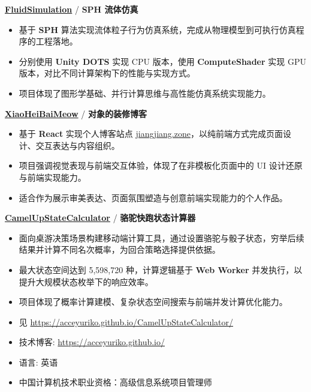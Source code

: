 \par \textbf{\href{https://github.com/Acceyuriko/FluidSimulation}{FluidSimulation}} / \textbf{SPH 流体仿真}
\begin{itemize}
  \item 基于 \textbf{SPH} 算法实现流体粒子行为仿真系统，完成从物理模型到可执行仿真程序的工程落地。
  \item 分别使用 \textbf{Unity DOTS} 实现 CPU 版本，使用 \textbf{ComputeShader} 实现 GPU 版本，对比不同计算架构下的性能与实现方式。
  \item 项目体现了图形学基础、并行计算思维与高性能仿真系统实现能力。
\end{itemize}

\par \textbf{\href{https://github.com/Acceyuriko/XiaoHeiBaiMeow}{XiaoHeiBaiMeow}} / \textbf{对象的装修博客}
\begin{itemize}
  \item 基于 \textbf{React} 实现个人博客站点 \href{https://jiangjiang.zone/}{jiangjiang.zone}，以纯前端方式完成页面设计、交互表达与内容组织。
  \item 项目强调视觉表现与前端交互体验，体现了在非模板化页面中的 UI 设计还原与前端实现能力。
  \item 适合作为展示审美表达、页面氛围塑造与创意前端实现能力的个人作品。
\end{itemize}

\par \textbf{\href{https://github.com/Acceyuriko/CamelUpStateCalculator}{CamelUpStateCalculator}} / \textbf{骆驼快跑状态计算器}
\begin{itemize}
  \item 面向桌游决策场景构建移动端计算工具，通过设置骆驼与骰子状态，穷举后续结果并计算不同名次概率，为回合策略选择提供依据。
  \item 最大状态空间达到 5,598,720 种，计算逻辑基于 \textbf{Web Worker} 并发执行，以提升大规模状态枚举下的响应效率。
  \item 项目体现了概率计算建模、复杂状态空间搜索与前端并发计算优化能力。
  \item 见 \href{https://acceyuriko.github.io/CamelUpStateCalculator/}{https://acceyuriko.github.io/CamelUpStateCalculator/}
\end{itemize}


\begin{itemize}[parsep=0.5ex]
  \item 技术博客: \href{https://acceyuriko.github.io/}{https://acceyuriko.github.io/}
  \item 语言: 英语
  \item 中国计算机技术职业资格：高级信息系统项目管理师
\end{itemize}
